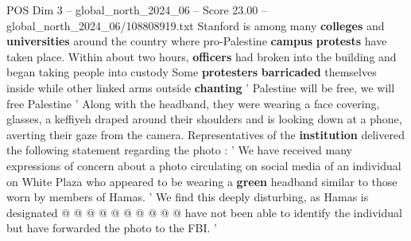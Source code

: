 \begin{textsample}{POS Dim 3 – global\_north\_2024\_06 – Score 23.00 – global\_north\_2024\_06/108808919.txt}
Stanford is among many \textbf{colleges} and \textbf{universities} around the country where pro-Palestine \textbf{campus} \textbf{protests} have taken place.
Within about two hours, \textbf{officers} had broken into the building and began taking people into custody Some \textbf{protesters} \textbf{barricaded} themselves inside while other linked arms outside \textbf{chanting} ' Palestine will be free, we will free Palestine ' Along with the headband, they were wearing a face covering, glasses, a keffiyeh draped around their shoulders and is looking down at a phone, averting their gaze from the camera.
Representatives of the \textbf{institution} delivered the following statement regarding the photo : ' We have received many expressions of concern about a photo circulating on social media of an individual on White Plaza who appeared to be wearing a \textbf{green} headband similar to those worn by members of Hamas. ' We find this deeply disturbing, as Hamas is designated @ @ @ @ @ @ @ @ @ @ have not been able to identify the individual but have forwarded the photo to the FBI. '

\end{textsample}
